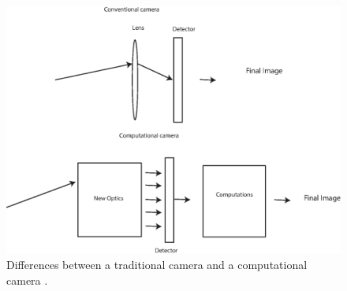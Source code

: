 \begin{figure}[H]
	\centering
	\includegraphics[width=.7\textwidth]{systemsNew.eps}
	\caption{\label{fig:systems}Differences between a traditional camera and a computational camera \cite{nayar2006computational}.}
\end{figure}
